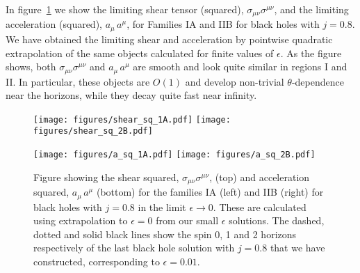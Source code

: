 \documentclass[12pt]{article}
\numberwithin{equation}{section}
\begin{document}
In figure~\ref{fig:lim_shear_and_a2} we show the limiting shear tensor (squared), $\sigma_{\mu\nu}\sigma^{\mu\nu}$, and the limiting acceleration (squared), $a_\mu\,a^\mu$, for Families IA and IIB for black holes with $j=0.8$. We have obtained the limiting shear and acceleration by pointwise quadratic extrapolation of the same objects calculated for finite values of $\epsilon$. As the figure shows, both $\sigma_{\mu\nu}\sigma^{\mu\nu}$ and $a_\mu\,a^\mu$ are smooth and look quite similar in regions I and II. In particular, these objects are $O(1)$ and develop non-trivial $\theta$-dependence near the horizons, while they decay quite fast near infinity.  

\begin{figure}
\centerline{  
  \texttt{[image: figures/shear\_sq\_1A.pdf]}
  \texttt{[image: figures/shear\_sq\_2B.pdf]}
  }
  \centerline{  
  \texttt{[image: figures/a\_sq\_1A.pdf]}
  \texttt{[image: figures/a\_sq\_2B.pdf]}
  }
  \caption{\label{fig:lim_shear_and_a2}
  Figure showing the shear squared, $\sigma_{\mu\nu}\sigma^{\mu\nu}$, (top) and acceleration squared, $a_\mu\,a^\mu$ (bottom) for the families IA (left) and IIB (right) for black holes with $j=0.8$ in the limit $\epsilon \to 0$. These are calculated using extrapolation to $\epsilon=0$ from our small $\epsilon$ solutions. The dashed, dotted and solid black lines show the spin 0, 1 and 2 horizons respectively of the last black hole solution with $j=0.8$ that we have constructed, corresponding to $\epsilon=0.01$.
  }
\end{figure}
\end{document}
